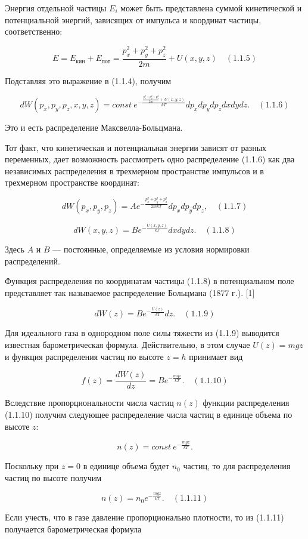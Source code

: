 Энергия отдельной частицы $E_i$ может быть представлена суммой кинетической и потенциальной энергий, зависящих от импульса и координат частицы, соответственно:

$$E=E_\text{кин}+E_{\text{пот}}=\frac{p_{x}^2+p_{y}^2+p_{z}^2}{2m}+ U(x,y,z)\quad (1.1.5)$$

Подставляя это выражение в (1.1.4), получим

$$dW(p_x,p_y,p_z, x,y,z)=const \: e^{-\frac{\frac{p_{x}^2+p_{y}^2+p_{z}^2}{2m}+ U(x,y,z)}{kT}}dp_xdp_ydp_zdxdydz. \quad (1.1.6)$$

Это и есть распределение Максвелла-Больцмана.

Тот факт, что кинетическая и потенциальная энергии зависят от разных переменных, дает возможность рассмотреть одно распределение (1.1.6) как два независимых распределения в трехмерном пространстве импульсов и в трехмерном пространстве координат:

$$dW(p_x,p_y,p_z)=Ae^{-\frac{p_{x}^2+p_{y}^2+p_{z}^2}{2mkT}}dp_xdp_ydp_z, \quad (1.1.7)$$

$$dW(x,y,z)=Be^{-\frac{U(x,y,z)}{kT}}dxdydz. \quad (1.1.8)$$

Здесь $A$ и $B$ $—$ постоянные, определяемые из условия нормировки распределений.

Функция распределения по координатам частицы (1.1.8) в потенциальном поле представляет так называемое распределение Больцмана (1877 г.). [1]

$$dW(z)=Be^{-\frac{U(z)}{kT}}dz. \quad (1.1.9)$$

Для идеального газа в однородном поле силы тяжести из (1.1.9) выводится известная барометрическая формула. Действительно, в этом случае $U(z)=mgz$ и функция распределения частиц по высоте $z=h$ принимает вид

$$f(z)=\frac{dW(z)}{dz}=Be^{-\frac{mgz}{kT}}. \quad (1.1.10)$$

Вследствие пропорциональности числа частиц $n(z)$ функции распределения (1.1.10) получим следующее распределение числа частиц в единице объема по высоте $z$:

$$n(z)=const \: e^{-\frac{mgz}{kT}}.$$

Поскольку при $z=0$ в единице объема будет $n_0$ частиц, то для распределения частиц по высоте получим

$$n(z)= n_0 e^{-\frac{mgz}{kT}}. \quad (1.1.11)$$

Если учесть, что в газе давление пропорционально плотности, то из (1.1.11) получается барометрическая формула

